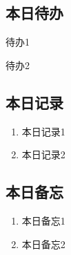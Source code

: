     \subsection{本日待办}
      \begin{todolist}
        \item 待办1
        \item 待办2
      \end{todolist}
    \subsection{本日记录}
      \begin{enumerate}
        \item 本日记录1
        \item 本日记录2
      \end{enumerate}
    \subsection{本日备忘}
      \begin{enumerate}
        \item 本日备忘1
        \item 本日备忘2
      \end{enumerate}
